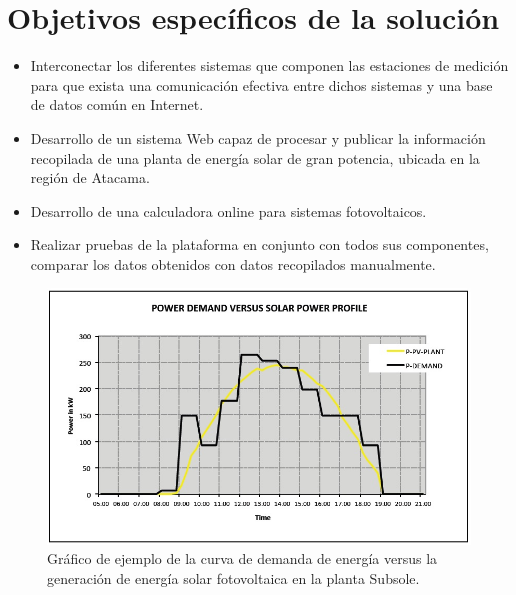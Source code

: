 \section{Objetivos específicos de la solución}
\begin{itemize}
\item Interconectar los diferentes sistemas que componen las estaciones de medición para que exista una comunicación efectiva entre dichos sistemas y una base de datos común en Internet.
\item Desarrollo de un sistema Web capaz de procesar y publicar la información recopilada de una planta de energía solar de gran potencia, ubicada en la región de Atacama.
\item Desarrollo de una calculadora online para sistemas fotovoltaicos.
\item Realizar pruebas de la plataforma en conjunto con todos sus componentes, comparar los datos obtenidos con datos recopilados manualmente.
\end{itemize}

\begin{figure}[h!]
        \centering
        \includegraphics[scale=0.5]{images/demandaGeneracionSubSole}
        \caption{\tiny Gráfico de ejemplo de la curva de demanda de energía versus la generación de energía solar fotovoltaica en la planta Subsole.}
\end{figure}

